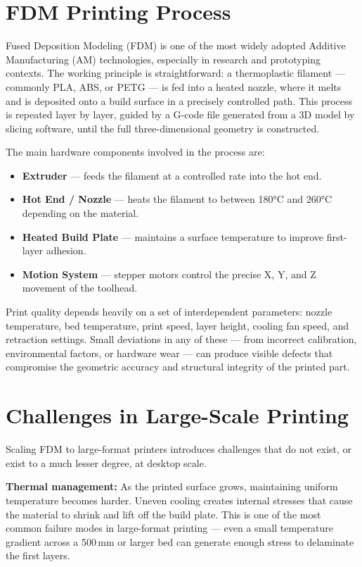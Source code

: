 \documentclass[english, Lau, oneside]{sapthesis}
\begin{document}
\section{FDM Printing Process}
Fused Deposition Modeling (FDM) is one of the most widely adopted Additive Manufacturing (AM) technologies, especially in research and prototyping contexts. The working principle is straightforward: a thermoplastic filament --- commonly PLA, ABS, or PETG --- is fed into a heated nozzle, where it melts and is deposited onto a build surface in a precisely controlled path. This process is repeated layer by layer, guided by a G-code file generated from a 3D model by slicing software, until the full three-dimensional geometry is constructed.

The main hardware components involved in the process are:
\begin{itemize}
    \item \textbf{Extruder} --- feeds the filament at a controlled rate into the hot end.
    \item \textbf{Hot End / Nozzle} --- heats the filament to between 180°C and 260°C depending on the material.
    \item \textbf{Heated Build Plate} --- maintains a surface temperature to improve first-layer adhesion.
    \item \textbf{Motion System} --- stepper motors control the precise X, Y, and Z movement of the toolhead.
\end{itemize}

Print quality depends heavily on a set of interdependent parameters: nozzle temperature, bed temperature, print speed, layer height, cooling fan speed, and retraction settings. Small deviations in any of these --- from incorrect calibration, environmental factors, or hardware wear --- can produce visible defects that compromise the geometric accuracy and structural integrity of the printed part.

\section{Challenges in Large-Scale Printing}
Scaling FDM to large-format printers introduces challenges that do not exist, or exist to a much lesser degree, at desktop scale.

\textbf{Thermal management:} As the printed surface grows, maintaining uniform temperature becomes harder. Uneven cooling creates internal stresses that cause the material to shrink and lift off the build plate. This is one of the most common failure modes in large-format printing --- even a small temperature gradient across a 500\,mm or larger bed can generate enough stress to delaminate the first layers.
\end{document}
